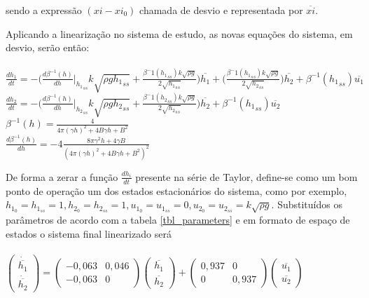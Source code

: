 sendo a expressão $(xi - xi_0)$ chamada de desvio e representada por $\overline{xi}$.

Aplicando a linearização no sistema de estudo, as novas equações do sistema, em desvio, serão então:
\\\\
$
\frac{dh_1}{dt} = -\big(\frac{d\beta^{-1}(h)}{dh}\bigg|_{{h_1}_{ss}} k\sqrt{\rho g {h_1}_{ss}} + \frac{\beta^-1({h_1}_{ss}) k\sqrt{\rho g}}{2\sqrt{{h_1}_{ss}}}\big)\overline{h_1} + \big(\frac{\beta^-1({h_1}_{ss}) k\sqrt{\rho g}}{2\sqrt{{h_2}_{ss}}}\big)\overline{h_2} +  \beta^{-1}({h_1}_{ss})\overline{u_1}
$
\\
$
\frac{dh_2}{dt} = -\big(\frac{d\beta^{-1}(h)}{dh}\bigg|_{{h_2}_{ss}} k\sqrt{\rho g {h_2}_{ss}} + \frac{\beta^-1({h_2}_{ss}) k\sqrt{\rho g}}{2\sqrt{{h_2}_{ss}}}\big)\overline{h_2} + \beta^{-1}({h_1}_{ss})\overline{u_2}
$
\\
$
\beta^{-1}(h) = \frac{4}{4\pi(\gamma h)^2 + 4B\gamma h + B^2} 
$
\\
$
\frac{d\beta^{-1}(h)}{dh} = -4 \frac{8 \pi \gamma^2 h + 4 \gamma B}{(4\pi(\gamma h)^2 + 4B\gamma h + B^2)^2}
$

De forma a zerar a função $\frac{dh_i}{dt}$ presente na série de Taylor, define-se como um bom ponto de operação um dos estados estacionários do sistema, como por exemplo,  $h_{1_0}=h_{1_{ss}}=1, h_{2_0}=h_{2_{ss}}=1, u_{1_0}=u_{1_{ss}}=0, u_{2_0}=u_{2_{ss}}=k\sqrt{\rho g}$. Substituídos os parâmetros de acordo com a tabela \ref{tbl_parameters} e em formato de espaço de estados o sistema final linearizado será
\\\\
$
\begin{pmatrix} \dot{\overline{h_1}} \\ \dot{\overline{h_2}} \end{pmatrix} = \begin{pmatrix} -0,063 & 0,046 \\ -0,063 & 0 \end{pmatrix} \begin{pmatrix} \overline{h_1} \\ \overline{h_2} \end{pmatrix} + \begin{pmatrix} 0,937 & 0 \\ 0 & 0,937 \end{pmatrix} \begin{pmatrix} \overline{u_1} \\ \overline{u_2} \end{pmatrix}
$
\\\\
